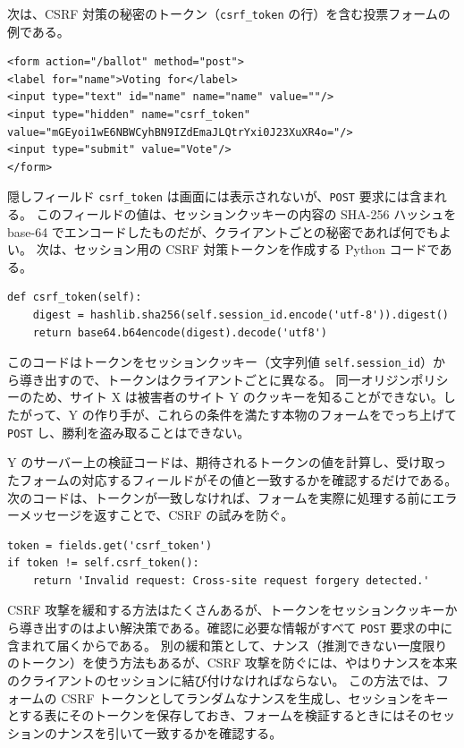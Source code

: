 \documentclass[uplatex]{jsarticle}
\begin{document}
次は、CSRF 対策の秘密のトークン（\texttt{csrf\_token} の行）を含む投票フォームの例である。
\begin{verbatim}
<form action="/ballot" method="post">
<label for="name">Voting for</label>
<input type="text" id="name" name="name" value=""/>
<input type="hidden" name="csrf_token"
value="mGEyoi1wE6NBWCyhBN9IZdEmaJLQtrYxi0J23XuXR4o="/>
<input type="submit" value="Vote"/>
</form>
\end{verbatim}
隠しフィールド \texttt{csrf\_token} は画面には表示されないが、\texttt{POST} 要求には含まれる。
このフィールドの値は、セッションクッキーの内容の SHA-256 ハッシュを base-64 でエンコードしたものだが、クライアントごとの秘密であれば何でもよい。
次は、セッション用の CSRF 対策トークンを作成する Python コードである。
\begin{verbatim}
def csrf_token(self):
    digest = hashlib.sha256(self.session_id.encode('utf-8')).digest()
    return base64.b64encode(digest).decode('utf8')
\end{verbatim}
このコードはトークンをセッションクッキー（文字列値 \texttt{self.session\_id}）から導き出すので、トークンはクライアントごとに異なる。
同一オリジンポリシーのため、サイト X は被害者のサイト Y のクッキーを知ることができない。したがって、Y の作り手が、これらの条件を満たす本物のフォームをでっち上げて \texttt{POST} し、勝利を盗み取ることはできない。

Y のサーバー上の検証コードは、期待されるトークンの値を計算し、受け取ったフォームの対応するフィールドがその値と一致するかを確認するだけである。
次のコードは、トークンが一致しなければ、フォームを実際に処理する前にエラーメッセージを返すことで、CSRF の試みを防ぐ。
\begin{verbatim}
token = fields.get('csrf_token')
if token != self.csrf_token():
    return 'Invalid request: Cross-site request forgery detected.'
\end{verbatim}

CSRF 攻撃を緩和する方法はたくさんあるが、トークンをセッションクッキーから導き出すのはよい解決策である。確認に必要な情報がすべて \texttt{POST} 要求の中に含まれて届くからである。
別の緩和策として、ナンス（推測できない一度限りのトークン）を使う方法もあるが、CSRF 攻撃を防ぐには、やはりナンスを本来のクライアントのセッションに結び付けなければならない。
この方法では、フォームの CSRF トークンとしてランダムなナンスを生成し、セッションをキーとする表にそのトークンを保存しておき、フォームを検証するときにはそのセッションのナンスを引いて一致するかを確認する。
\end{document}
